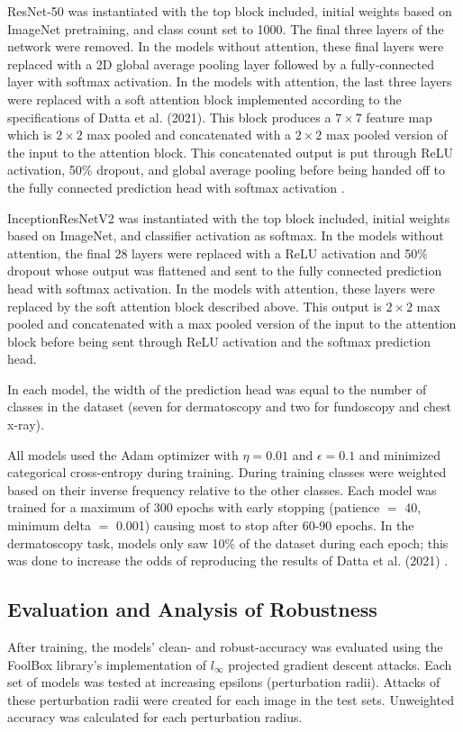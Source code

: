 \documentclass[10pt,twocolumn,letterpaper]{article}
\begin{document}
      ResNet-50 was instantiated with the top block included, initial weights based on ImageNet \cite{ImageNet} pretraining, and class count set to 1000. The final three layers of the network were removed. In the models without attention, these final layers were replaced with a 2D global average pooling layer followed by a fully-connected layer with softmax activation. In the models with attention, the last three layers were replaced with a soft attention block implemented according to the specifications of Datta et al. (2021). This block produces a $7 \times 7$ feature map which is $2 \times 2$ max pooled and concatenated with a $2 \times 2$ max pooled version of the input to the attention block. This concatenated output is put through ReLU activation, 50\% dropout, and global average pooling before being handed off to the fully connected prediction head with softmax activation \cite{AttentionSkinCancerClassification}.
      
      InceptionResNetV2 \cite{InceptionResNet} was instantiated with the top block included, initial weights based on ImageNet, and classifier activation as softmax. In the models without attention, the final 28 layers were replaced with a ReLU activation and 50\% dropout whose output was flattened and sent to the fully connected prediction head with softmax activation. In the models with attention, these layers were replaced by the soft attention block described above. This output is $2 \times 2$ max pooled and concatenated with a max pooled version of the input to the attention block before being sent through ReLU activation and the softmax prediction head.

      In each model, the width of the prediction head was equal to the number of classes in the dataset (seven for dermatoscopy and two for fundoscopy and chest x-ray).

      All models used the Adam optimizer with $\eta=0.01$ and $\epsilon=0.1$ and minimized categorical cross-entropy during training. During training classes were weighted based on their inverse frequency relative to the other classes. Each model was trained for a maximum of 300 epochs with early stopping (patience $=$ 40, minimum delta $=$ 0.001) causing most to stop after 60-90 epochs. In the dermatoscopy task, models only saw 10\% of the dataset during each epoch; this was done to increase the odds of reproducing the results of Datta et al. (2021) \cite{AttentionSkinCancerClassification}.

    \subsection{Evaluation and Analysis of Robustness}
      After training, the models' clean- and robust-accuracy was evaluated using the FoolBox \cite{FoolBoxPaper}\cite{FoolBoxLibrary} library's implementation of $l_\infty$ projected gradient descent attacks. Each set of models was tested at increasing epsilons (perturbation radii). Attacks of these perturbation radii were created for each image in the test sets. Unweighted accuracy was calculated for each perturbation radius.
\end{document}
